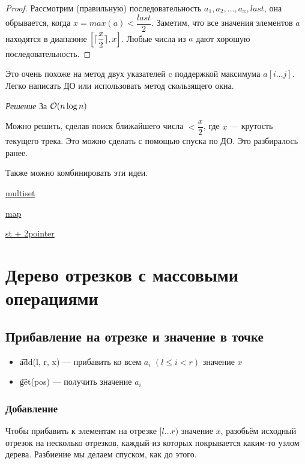 \begin{proof}
	Рассмотрим (правильную) последовательность $a_1, a_2, \ldots, a_x, last$, она обрывается, когда $x=max(a) < \dfrac{last}{2}$. Заметим, что все значения элементов $a$ находятся в диапазоне $\left[\lceil\dfrac{x}{2}\rceil, x\right]$. Любые числа из $a$ дают хорошую последовательность.
\end{proof}

Это очень похоже на метод двух указателей c поддержкой максимума $a[i \ldots j]$. Легко написать ДО или использовать метод скользящего окна.

\down

{\it Решение } За $ \mathcal{O}(n \log n)$
\href{https://codeforces.com/contest/1237/submission/62700019}{}

Можно решить, сделав поиск ближайшего числа $< \dfrac{x}{2}$, где $x$ --- крутость текущего трека. Это можно сделать с помощью спуска по ДО. Это разбиралось ранее. 

Также можно комбинировать эти идеи.

\href{https://codeforces.com/contest/1237/submission/62700598}{multiset }

\href{https://codeforces.com/contest/1237/submission/62695687}{map }

\href{https://codeforces.com/contest/1237/submission/62712896}{st + 2pointer }

\pagebreak

\section{Дерево отрезков с массовыми операциями}
\subsection{Прибавление на отрезке и значение в точке}

\begin{itemize}
	\item \t{add(l, r, x)} --- прибавить ко всем $a_i$ $(l \le i < r)$ значение $x$
	\item \t{get(pos)} --- получить значение $a_i$
\end{itemize}
\up \up

\subsubsection{Добавление}

Чтобы прибавить к элементам на отрезке $[l \ldots r)$ значение $x$, разобьём исходный отрезок на несколько отрезков, каждый из которых покрывается каким-то узлом дерева. Разбиение мы делаем спуском, как до этого.

